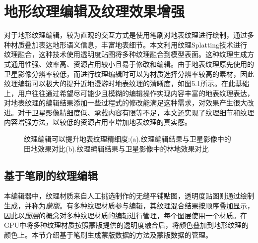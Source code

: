 \chapter{地形纹理编辑及纹理效果增强}
对于地形纹理编辑，较为直观的交互方式是使用笔刷对地表纹理进行绘制，通过多种材质叠加表达地形语义信息，丰富地表细节。本文利用纹理Splatting技术\supercite{splatting}进行纹理融合，这种技术使用透明度贴图将多种纹理融合到模型表面。这种纹理生成方式通用性强、效率高、资源占用较小且易于修改和编辑。由于地表纹理原先使用的卫星影像分辨率较低，而进行纹理编辑时可以为材质选择分辨率较高的素材，因此纹理编辑可以极大的提升近地漫游时地表纹理的清晰度，如图5.1所示。在此基础上，用户往往通过希望尽可能少且模糊的编辑操作实现内容丰富的地表纹理表达，对地表纹理的编辑结果添加一些过程式的修改能满足这种需求，对效果产生很大改进。对于卫星影像精细度低、承载内容有限等不足，本文还实现了纹理细节和纹理内容增强方法，以较低的资源占用率增加地表纹理的真实感。\par
\begin{figure}[htbp]
\centering
{}
\caption{纹理编辑可以提升地表纹理精细度:(a).纹理编辑结果与卫星影像中的田地效果对比(b).纹理编辑结果与卫星影像中的林地效果对比}
\end{figure}

\section{基于笔刷的纹理编辑}
本编辑器中，纹理材质来自人工挑选制作的无缝平铺贴图，透明度贴图则通过绘制生成，并称为\textit{蒙版}。有多种纹理材质参与编辑，其纹理混合结果按顺序叠加显示，因此以\textit{图层}的概念对多种纹理材质的编辑进行管理，每个图层使用一个材质。在GPU中将多种纹理材质按照蒙版提供的透明度融合后，将颜色叠加到地形纹理的颜色上。本节介绍基于笔刷生成蒙版数据的方法及蒙版数据的管理。

